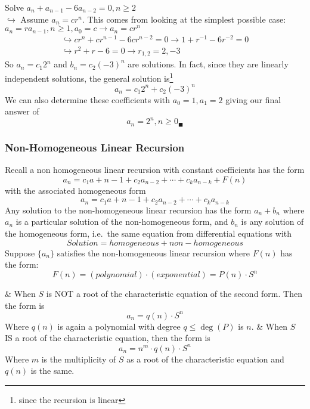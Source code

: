     \begin{ex}
        Solve $a_n + a_{n-1} - 6a_{n-2} = 0, n \ge 2$\\
        $\hookrightarrow$ Assume $a_n = cr^n$. This comes from looking at the simplest possible case: $a_n = r a_{n-1}, n \ge 1, a_0 = c \to a_n = cr^n$\\
        \[ \begin{aligned}
                \hookrightarrow cr^n + cr^{n-1} -6cr^{n-2} = 0 \to 1 + r^{-1} -6r^{-2} = 0\\
                \hookrightarrow r^2 +r -6=0 \to r_{1,2} = 2, -3
        \end{aligned} \]
        So $a_n = c_1 2^n$ and $b_n = c_2 {(-3)}^n$ are solutions. In fact, since they are linearly independent solutions, the general solution is\footnote{since the recursion is linear}
            \[ a_n = c_1 2^n + c_2 {(-3)}^n \]
        We can also determine these coefficients with $a_0 = 1, a_1 = 2$ giving our final answer of
            \[ a_n = 2^n, n \ge 0_\blacksquare \]
    \end{ex}

        \subsubsection{Non-Homogeneous Linear Recursion}
        \begin{thm}
            Recall a non homogeneous linear recursion with constant coefficients has the form
                \[ a_n = c_1a+{n-1} + c_2a_{n-2} + \cdots + c_k a_{n-k} + F(n) \]
            with the associated homogeneous form
                \[ a_n = c_1a+{n-1} + c_2a_{n-2} + \cdots + c_k a_{n-k} \]
            Any solution to the non-homogeneous linear recursion has the form $a_n + b_n$ where $a_n$ is a particular solution of the non-homogeneous form, and $b_n$ is any solution of the homogeneous form, i.e.\ the same equation from differential equations with
                \[ Solution = homogeneous + non-homogeneous \]
            Suppose $\{ a_n \}$ satisfies the non-homogeneous linear recursion where $F(n)$ has the form:
                \[ F(n) = (polynomial) \cdot (exponential) = P(n) \cdot S^n \]
            \begin{easylist}[enumerate]
                & When $S$ is NOT a root of the characteristic equation of the second form. Then the form is
                    \[ a_n = q(n) \cdot S^n \]
                Where $q(n)$ is again a polynomial with degree $q \le \deg(P)$ is $n$.
                & When $S$ IS a root of the characteristic equation, then the form is
                    \[ a_n = n^m \cdot q(n) \cdot S^n \]
                Where $m$ is the multiplicity of $S$ as a root of the characteristic equation and $q(n)$ is the same.
            \end{easylist}
        \end{thm}


